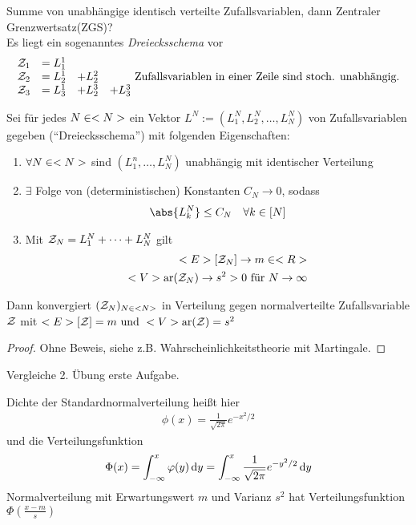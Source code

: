 Summe von unabhängige identisch verteilte Zufallsvariablen, dann Zentraler Grenzwertsatz(ZGS)?\\
Es liegt ein sogenanntes \emph{Dreiecksschema} vor
\begin{align*}
	\begin{matrix}
	\mathcal{Z}_1 &= L_1^1 & &\\
	\mathcal{Z}_2 &= L_2^1 &+L^2_2 &\\
	\mathcal{Z}_3 &= L_3^1 &+L^3_2 &+L^3_3\\
	\end{matrix} \text{ Zufallsvariablen in einer Zeile sind stoch. unabhängig.}
\end{align*}
\begin{theorem}
	Sei für jedes $N \in <N>$ ein Vektor $L^N := (L^N_1, L^N_2, \dots, L^N_N)$ von Zufallsvariablen gegeben (``Dreiecksschema'') mit folgenden Eigenschaften:
	\begin{enumerate}
		\item $\forall N \in <N>$ sind $(L^n_1, \dots, L_N^N)$ unabhängig mit identischer Verteilung
		\item $\exists$ Folge von (deterministischen) Konstanten $C_N \to 0$, sodass
		\begin{align*}
			\abs{L_k^N} \le C_N \quad \forall k \in [N]
		\end{align*}
		\item Mit $\mathcal{Z}_N = L^N_1 + \dots + L^N_N$ gilt
		\begin{align*}
			<E>[\mathcal{Z}_N] \to m \in <R>\\
			<V>\text{ar}(\mathcal{Z}_N) \to s^2 > 0 \text{ für }N \to \infty
		\end{align*}
	\end{enumerate}
	Dann konvergiert $(\mathcal{Z}_N)_{N \in <N>}$ in Verteilung gegen normalverteilte Zufallsvariable $\mathcal{Z}$ mit $<E>[\mathcal{Z}] = m \text{ und } <V>\text{ar}(\mathcal{Z}) = s^2$
\end{theorem}
\begin{proof}
	Ohne Beweis, siehe z.B. Wahrscheinlichkeitstheorie mit Martingale.
\end{proof}
\begin{*remark}
	Vergleiche 2. Übung erste Aufgabe.
\end{*remark}
\begin{erinnerung} %
	Dichte der Standardnormalverteilung heißt hier
	\begin{align*}
		\phi(x) = \frac{1}{\sqrt{2\pi}} e^{-x^2/2}
	\end{align*}
	und die Verteilungsfunktion
	\begin{align*}
		\Phi(x) = \int_{-\infty}^x \varphi(y) \,\mathrm{d} y = \int_{-\infty}^x \frac{1}{\sqrt{2\pi}} e^{-y^2/2} \,\mathrm{d} y
	\end{align*}
	Normalverteilung mit Erwartungswert $m$ und Varianz $s^2$ hat Verteilungsfunktion $\Phi(\frac{x-m}{s})$
\end{erinnerung}
